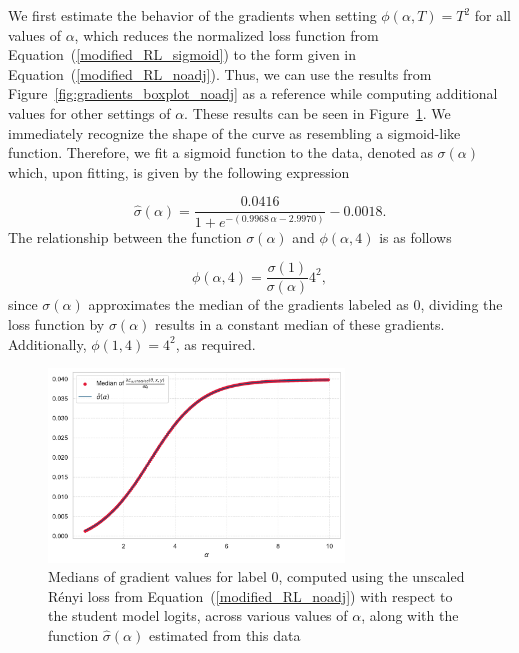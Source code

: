 We first estimate the behavior of the gradients when setting $\phi(\alpha,T)=T^2$ for all values of $\alpha$, which reduces the normalized loss function from Equation~(\ref{modified_RL_sigmoid}) to the form given in Equation~(\ref{modified_RL_noadj}). Thus, we can use the results from Figure~\ref{fig:gradients_boxplot_noadj} as a reference while computing additional values for other settings of $\alpha$. These results can be seen in Figure~\ref{fig:sigmoid_approx}. We immediately recognize the shape of the curve as resembling a sigmoid-like function. Therefore, we fit a sigmoid function to the data, denoted as $\sigma(\alpha)$ which, upon fitting, is given by the following expression

\begin{equation*}
	\hat{\sigma}(\alpha) = \frac{0.0416}{1 + e^{-(0.9968\, \alpha - 2.9970)}} - 0.0018.
\end{equation*}
The relationship between the function $\sigma(\alpha)$ and $\phi(\alpha,4)$ is as follows

\begin{equation*}
	\phi(\alpha,4) = \frac{\sigma(1)}{\sigma(\alpha)} 4^2,
\end{equation*}
since $\sigma(\alpha)$ approximates the median of the gradients labeled as 0, dividing the loss function by $\sigma(\alpha)$ results in a constant median of these gradients. Additionally, $\phi(1,4)=4^2$, as required.

\begin{figure}[h!]
	\centering
	\includegraphics[width=0.7\textwidth]{../img/sigmoid_approx.pdf}
	\caption{Medians of gradient values for label 0, computed using the unscaled Rényi loss from Equation~(\ref{modified_RL_noadj}) with respect to the student model logits, across various values of $\alpha$, along with the function $\hat{\sigma}(\alpha)$ estimated from this data}
	\label{fig:sigmoid_approx}
\end{figure} 

